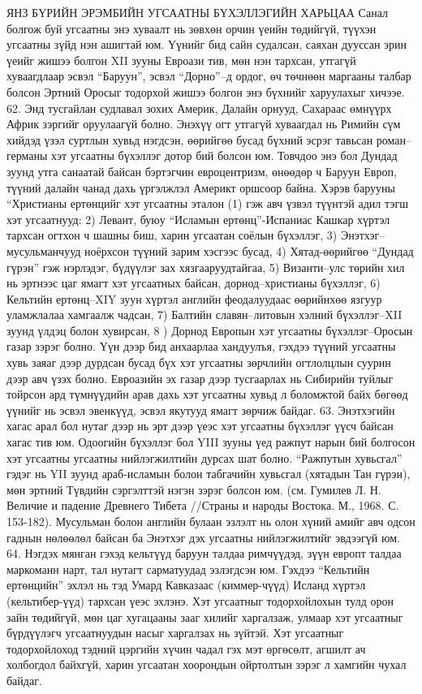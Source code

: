 ЯНЗ БҮРИЙН ЭРЭМБИЙН УГСААТНЫ БҮХЭЛЛЭГИЙН ХАРЬЦАА
Санал болгож буй угсаатны энэ хуваалт нь зөвхөн орчин үеийн төдийгүй, түүхэн угсаатны зүйд нэн ашигтай юм. Үүнийг бид сайн судалсан, саяхан дууссан эрин үеийг жишээ болгон XII зууны Евроази тив, мөн нэн тархсан, утгагүй хуваагдлаар эсвэл “Баруун”, эсвэл “Дорно”–д ордог, өч төчнөөн маргааны талбар болсон Эртний Оросыг тодорхой жишээ болгон энэ бүхнийг харуулахыг хичээе. 62. Энд тусгайлан судлавал зохих Америк, Далайн орнууд, Сахараас өмнүүрх Африк зэргийг оруулаагүй болно.
Энэхүү огт утгагүй хуваагдал нь Римийн сүм хийдэд үзэл суртлын хувьд нэгдсэн, өөрийгөө бусад бүхний эсрэг тавьсан роман–германы хэт угсаатны бүхэллэг дотор бий болсон юм. Товчдоо энэ бол Дундад зуунд утга санаатай байсан бэртэгчин евроцентризм, өнөөдөр ч Баруун Европ, түүний далайн чанад дахь үргэлжлэл Америкт оршсоор байна.
Хэрэв барууны “Христианы ертөнцийг хэт угсаатны эталон (1) гэж авч үзвэл түүнтэй адил тэгш хэт угсаатнууд: 2) Левант, буюу “Исламын ертөнц”-Испаниас Кашкар хүртэл тархсан огтхон ч шашны биш, харин угсаатан соёлын бүхэллэг, 3) Энэтхэг–мусульманчууд ноёрхсон түүний зарим хэсгээс бусад, 4) Хятад-өөрийгөө “Дундад гүрэн” гэж нэрлэдэг, бүдүүлэг зах хязгааруудтайгаа, 5) Византи–улс төрийн хил нь эртнээс цаг ямагт хэт угсаатных байсан, дорнод–христианы бүхэллэг, 6) Кельтийн ертөнц–XIY зуун хүртэл английн феодалуудаас өөрийнхөө язгуур уламжлалаа хамгаалж чадсан, 7) Балтийн славян–литовын хэлний бүхэллэг–XII зуунд үлдэц болон хувирсан, 8 ) Дорнод Европын хэт угсаатны бүхэллэг–Оросын газар зэрэг болно. Үүн дээр бид анхаарлаа хандуулъя, гэхдээ түүний угсаатны хувь заяаг дээр дурдсан бусад бүх хэт угсаатны зөрчлийн огтлолцлын суурин дээр авч үзэх болно. Евроазийн эх газар дээр тусгаарлах нь Сибирийн туйлыг тойрсон ард түмнүүдийн арав дахь хэт угсаатны хувьд л боломжтой байх бөгөөд үүнийг нь эсвэл эвенкүүд, эсвэл якутууд ямагт зөрчиж байдаг.
63. Энэтхэгийн хагас арал бол нутаг дээр нь эрт дээр үеэс хэт угсаатны бүхэллэг үүсч байсан хагас тив юм. Одоогийн бүхэллэг бол YIII зууны үед ражпут нарын бий болгосон хэт угсаатны угсаатны нийлэгжилтийн дурсах шат болно. “Ражпутын хувьсгал” гэдэг нь YII зуунд араб-исламын болон табгачийн хувьсгал (хятадын Тан гүрэн), мөн эртний Түвдийн сэргэлттэй нэгэн зэрэг болсон юм. (см. Гумилев Л. Н. Величие и падение Древнего Тибета //Страны и народы Востока. М., 1968. С. 153-182). Мусульман болон английн булаан эзлэлт нь олон хүний амийг авч одсон гаднын нөлөөлөл байсан ба Энэтхэг дэх угсаатны нийлэгжилтийг эвдээгүй юм.
64. Нэгдэх мянган гэхэд кельтүүд баруун талдаа римчүүдэд, зүүн европт талдаа маркоманн нарт, тал нутагт сарматуудад эзлэгдсэн юм. Гэхдээ “Кельтийн ертөнцийн” эхлэл нь тэд Умард Кавказаас (киммер-чүүд) Исланд хүртэл (кельтибер-үүд) тархсан үеэс эхлэнэ. Хэт угсаатныг тодорхойлохын тулд орон зайн төдийгүй, мөн цаг хугацааны зааг хилийг харгалзаж, улмаар хэт угсаатныг бүрдүүлэгч угсаатнуудын насыг харгалзах нь зүйтэй. Хэт угсаатныг тодорхойлоход тэдний цэргийн хүчин чадал гэх мэт өргөсөлт, агшилт ач холбогдол байхгүй, харин угсаатан хоорондын ойртолтын зэрэг л хамгийн чухал байдаг.
